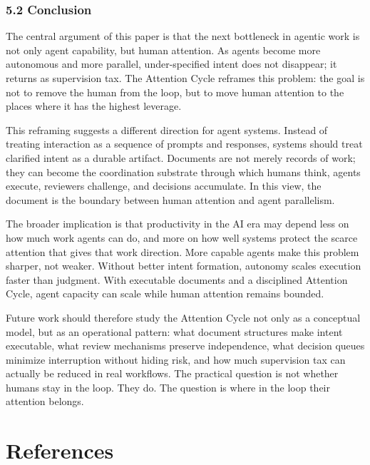 \documentclass[
  nonatbib,
  preprint]{article}
\begin{document}
\subsubsection{\texorpdfstring{\textbf{5.2
Conclusion}}{5.2 Conclusion}}\label{conclusion}

The central argument of this paper is that the next bottleneck in
agentic work is not only agent capability, but human attention. As
agents become more autonomous and more parallel, under-specified intent
does not disappear; it returns as supervision tax. The Attention Cycle
reframes this problem: the goal is not to remove the human from the
loop, but to move human attention to the places where it has the highest
leverage.

This reframing suggests a different direction for agent systems. Instead
of treating interaction as a sequence of prompts and responses, systems
should treat clarified intent as a durable artifact. Documents are not
merely records of work; they can become the coordination substrate
through which humans think, agents execute, reviewers challenge, and
decisions accumulate. In this view, the document is the boundary between
human attention and agent parallelism.

The broader implication is that productivity in the AI era may depend
less on how much work agents can do, and more on how well systems
protect the scarce attention that gives that work direction. More
capable agents make this problem sharper, not weaker. Without better
intent formation, autonomy scales execution faster than judgment. With
executable documents and a disciplined Attention Cycle, agent capacity
can scale while human attention remains bounded.

Future work should therefore study the Attention Cycle not only as a
conceptual model, but as an operational pattern: what document
structures make intent executable, what review mechanisms preserve
independence, what decision queues minimize interruption without hiding
risk, and how much supervision tax can actually be reduced in real
workflows. The practical question is not whether humans stay in the
loop. They do. The question is where in the loop their attention
belongs.

\section*{References}\label{bibliography}
\end{document}
